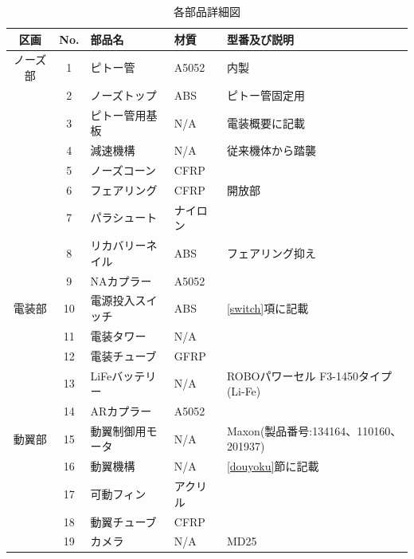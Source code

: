 \documentclass[a4paper,11pt,uplatex]{jsarticle}
\begin{document}
\renewcommand{\arraystretch}{0.9}
\begin{longtable}[H]{cclll}
	\caption{各部品詳細図}
	\label{s_buhin}                                                    \\
	\toprule
	区画    & No. & 部品名       & 材質    & 型番及び説明                           \\ \hline \endhead
	ノーズ部  & 1   & ピトー管      & A5052 & 内製                               \\
	      & 2   & ノーズトップ    & ABS   & ピトー管固定用                          \\
	      & 3   & ピトー管用基板   & N/A   & 電装概要に記載                          \\
	      & 4   & 減速機構      & N/A   & 従来機体から踏襲                         \\
	      & 5   & ノーズコーン    & CFRP  &                                  \\
	      & 6   & フェアリング    & CFRP  & 開放部                              \\
	      & 7   & パラシュート    & ナイロン  &                                  \\
	      & 8   & リカバリーネイル  & ABS   & フェアリング抑え                         \\\midrule
	      & 9   & NAカプラー    & A5052 &                                  \\ \midrule
	電装部   & 10  & 電源投入スイッチ  & ABS   & \ref{switch}項に記載                 \\
	      & 11  & 電装タワー     & N/A   &                                  \\
	      & 12  & 電装チューブ    & GFRP  &                                  \\
	      & 13  & LiFeバッテリー & N/A   & ROBOパワーセル F3-1450タイプ(Li-Fe)      \\ \midrule
	      & 14  & ARカプラー    & A5052 &                                  \\ \midrule
	動翼部   & 15  & 動翼制御用モータ  & N/A   & Maxon(製品番号:134164、110160、201937) \\
	      & 16  & 動翼機構      & N/A   & \ref{douyoku}節に記載                \\
	      & 17  & 可動フィン     & アクリル  &                                  \\
	      & 18  & 動翼チューブ    & CFRP                                     \\
	      & 19  & カメラ       & N/A   & MD25                             \\

\end{longtable}
\end{document}
